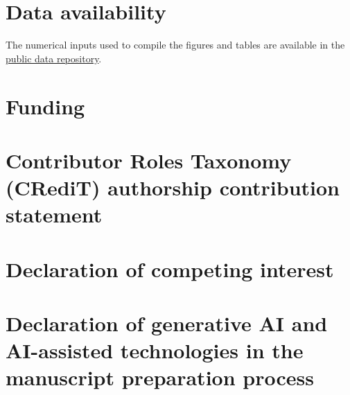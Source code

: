 \documentclass[a4paper,fleqn]{cas-sc}
\begin{document}
\section*{Data availability}
The numerical inputs used to compile the figures and tables are available in the \href{https://github.com/rois1995/InterpolationPaper}{public data repository}.

\section*{Funding}
\FundingStatement

\section*{Contributor Roles Taxonomy (CRediT) authorship contribution statement}
\AuthorContributionStatement

\section*{Declaration of competing interest}
\CompetingInterestStatement

\section*{Declaration of generative AI and AI-assisted technologies in the manuscript preparation process}
\ManuscriptAssistanceStatement



\end{document}
